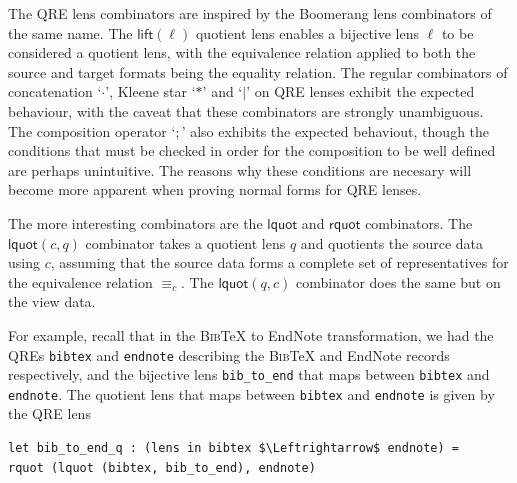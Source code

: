 \documentclass{svproc}
\newcommand{\cd}[1]{\lstinline[backgroundcolor=\color{white}]$#1$}
\newcommand{\kw}[1]{\ensuremath{\mathsf{#1}}}
\newcommand{\bibtex}{\textsc{Bib}\TeX{}}
\newcommand{\eqrel}[1]{\ensuremath{\equiv_{#1}}}
\begin{document}
The QRE lens combinators are inspired by the Boomerang lens combinators of the
same name. The $\kw{lift}(\ell)$ quotient lens enables a bijective lens
$\ell$ to be considered a quotient lens, with the equivalence relation applied
to both the source and target formats being the equality relation. The
regular combinators of concatenation `$\cdot$', Kleene star `$*$' and 
`$|$' on QRE lenses exhibit the expected behaviour, with the caveat that these
combinators are strongly unambiguous. The composition operator `$;$' also
exhibits the expected behaviout, though the conditions that must be checked in
order for the composition to be well defined are perhaps unintuitive. The
reasons why these conditions are necesary will become more apparent when
proving normal forms for QRE lenses.

The more interesting combinators are the $\kw{lquot}$ and $\kw{rquot}$
combinators. The $\kw{lquot}(c, q)$ combinator takes a quotient lens $q$ and
quotients the source data using $c$, assuming that the source data forms a
complete set of representatives for the equivalence relation $\eqrel{c}$. The
$\kw{lquot}(q, c)$ combinator does the same but on the view data. 

For example, recall that in the \bibtex{} to EndNote transformation, we had the
QREs \cd{bibtex} and \cd{endnote} describing the \bibtex{} and EndNote records
respectively, and the bijective lens \cd{bib_to_end} that maps between
\cd{bibtex} and \cd{endnote}. The quotient lens that maps between
\cd{bibtex} and \cd{endnote} is given by the QRE lens

\begin{lstlisting}
let bib_to_end_q : (lens in bibtex $\Leftrightarrow$ endnote) = 
rquot (lquot (bibtex, bib_to_end), endnote)
 \end{lstlisting} 

\end{document}
